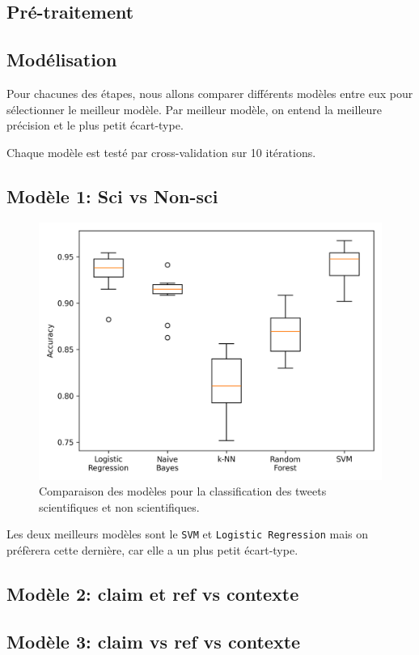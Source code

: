 \subsection{Pré-traitement}


\subsection{Modélisation}
Pour chacunes des étapes, nous allons comparer différents modèles entre eux pour sélectionner le meilleur modèle.
Par meilleur modèle, on entend la meilleure précision et le plus petit écart-type.

Chaque modèle est testé par cross-validation sur 10 itérations.

\subsection{Modèle 1: Sci vs Non-sci}

\begin{figure}[H]
    \centering
    \includegraphics{images/model_comparison}
    \caption{Comparaison des modèles pour la classification des tweets scientifiques et non scientifiques.}
    \label{fig:model_comparison_sci_nsci}
\end{figure}

Les deux meilleurs modèles sont le \texttt{SVM} et \texttt{Logistic Regression} mais on préfèrera cette dernière, car elle a un plus petit écart-type.

\subsection{Modèle 2: claim et ref vs contexte}

\subsection{Modèle 3: claim vs ref vs contexte}
